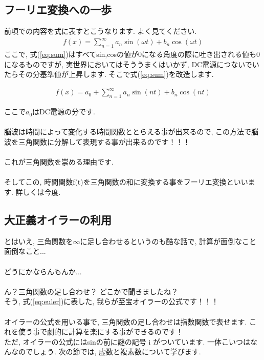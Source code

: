 \documentclass[11pt,a4paper]{jreport}
\begin{document}
\subsection{フーリエ変換への一歩}
前項での内容を式に表すとこうなります. よく見てください.
\begin{eqnarray}
f(x) = \sum_{n=1}^\infty {a_n \sin(\omega t) + b_n\cos(\omega t)}
\label{eq:sum}
\end{eqnarray}
ここで, 式(\ref{eq:sum})はすべてsin,cosの値が0になる角度の際に吐き出される値も0になるものですが, 実世界においてはそううまくはいかず, DC電源につないでいたらその分基準値が上昇します. そこで式(\ref{eq:sum})を改造します.

\begin{eqnarray}
f(x) = a_0 + \sum_{n=1}^\infty {a_n \sin(nt) + b_n\cos(nt)}
\label{eq:fixed_sum}
\end{eqnarray}

ここで$a_0$はDC電源の分です.\\
\\
脳波は時間によって変化する時間関数ととらえる事が出来るので, この方法で脳波を三角関数に分解して表現する事が出来るのです！！！\\
\\
これが三角関数を崇める理由です.\\
\\
そしてこの, 時間関数f(t)を三角関数の和に変換する事をフーリエ変換といいます. 詳しくは今度.\\
\subsection{大正義オイラーの利用}
とはいえ, 三角関数を$∞$に足し合わせるというのも酷な話で, 計算が面倒なこと面倒なこと...\\
\\
どうにかならんもんか...\\
\\
ん？三角関数の足し合わせ？ どこかで聞きましたね？\\
そう, 式(\ref{eq:euler})に表した, 我らが至宝オイラーの公式です！！！\\
\\
オイラーの公式を用いる事で, 三角関数の足し合わせは指数関数で表せます. これを使う事で劇的に計算を楽にする事ができるのです！\\
ただ, オイラーの公式にはsinの前に謎の記号 i がついています. 一体こいつはなんなのでしょう. 次の節では, 虚数と複素数について学びます.\\
\end{document}
